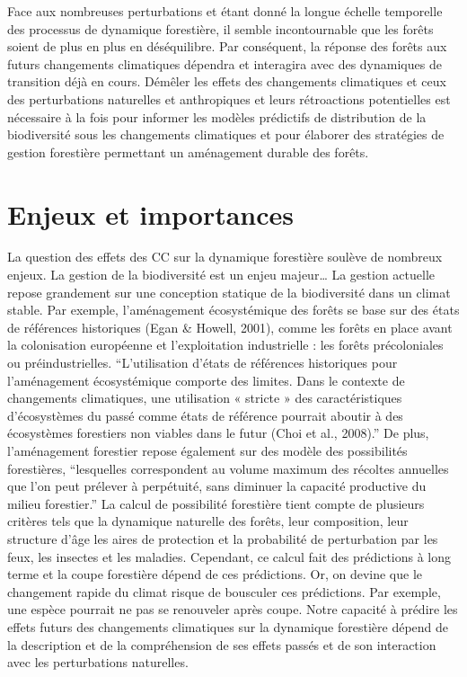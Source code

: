 \documentclass[
]{article}
\begin{document}
Face aux nombreuses perturbations et étant donné la longue échelle
temporelle des processus de dynamique forestière, il semble
incontournable que les forêts soient de plus en plus en déséquilibre.
Par conséquent, la réponse des forêts aux futurs changements climatiques
dépendra et interagira avec des dynamiques de transition déjà en cours.
Démêler les effets des changements climatiques et ceux des perturbations
naturelles et anthropiques et leurs rétroactions potentielles est
nécessaire à la fois pour informer les modèles prédictifs de
distribution de la biodiversité sous les changements climatiques et pour
élaborer des stratégies de gestion forestière permettant un aménagement
durable des forêts.

\hypertarget{enjeux-et-importances}{%
\section{Enjeux et importances}\label{enjeux-et-importances}}

La question des effets des CC sur la dynamique forestière soulève de
nombreux enjeux. La gestion de la biodiversité est un enjeu
majeur\ldots{} La gestion actuelle repose grandement sur une conception
statique de la biodiversité dans un climat stable. Par exemple,
l'aménagement écosystémique des forêts se base sur des états de
références historiques (Egan \& Howell, 2001), comme les forêts en place
avant la colonisation européenne et l'exploitation industrielle : les
forêts précoloniales ou préindustrielles. ``L'utilisation d'états de
références historiques pour l'aménagement écosystémique comporte des
limites. Dans le contexte de changements climatiques, une utilisation «
stricte » des caractéristiques d'écosystèmes du passé comme états de
référence pourrait aboutir à des écosystèmes forestiers non viables dans
le futur (Choi et al., 2008).'' De plus, l'aménagement forestier repose
également sur des modèle des possibilités forestières, ``lesquelles
correspondent au volume maximum des récoltes annuelles que l'on peut
prélever à perpétuité, sans diminuer la capacité productive du milieu
forestier.'' La calcul de possibilité forestière tient compte de
plusieurs critères tels que la dynamique naturelle des forêts, leur
composition, leur structure d'âge les aires de protection et la
probabilité de perturbation par les feux, les insectes et les maladies.
Cependant, ce calcul fait des prédictions à long terme et la coupe
forestière dépend de ces prédictions. Or, on devine que le changement
rapide du climat risque de bousculer ces prédictions. Par exemple, une
espèce pourrait ne pas se renouveler après coupe. Notre capacité à
prédire les effets futurs des changements climatiques sur la dynamique
forestière dépend de la description et de la compréhension de ses effets
passés et de son interaction avec les perturbations naturelles.
\end{document}
